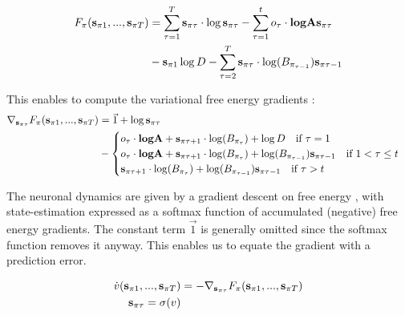 \documentclass[review,12pt,authoryear]{elsarticle}
\begin{document}
\begin{equation}
    \begin{split}
        F_\pi(\bold s_{\pi 1},...,\bold s_{\pi T}) &= \sum_{\tau = 1}^T \bold s_{\pi \tau } \cdot \log \bold s_{\pi \tau } 
        - \sum_{\tau = 1}^t o_\tau \cdot \textbf{log} \bold A \bold s_{\pi \tau }\\
        &- \bold s_{\pi 1 } \log D- \sum_{\tau = 2}^T \bold s_{\pi \tau } \cdot \log (B_{\pi_{\tau-1}})\bold s_{\pi \tau-1 }
    \end{split}
\end{equation}

This enables to compute the variational free energy gradients \citep{petersenMatrixCookbook}:
\begin{equation}
    \label{eq:vfe gradients perception}
    \begin{split}
        \nabla_{\bold s_{\pi\tau}} F_\pi(\bold s_{\pi 1},...,\bold s_{\pi T})& = \vec {1} +\log  \bold s_{\pi\tau}  \\
        &- \begin{cases}
             o_\tau \cdot \textbf{log} \bold A+ \bold s_{\pi\tau+1} \cdot \log (B_{\pi_{\tau}}) + \log D \quad  \text{if } \tau = 1 \\
            o_\tau \cdot \textbf{log} \bold A+ \bold s_{\pi\tau+1} \cdot \log (B_{\pi_{\tau}}) +\log (B_{\pi_{\tau-1}}) \bold s_{\pi\tau-1} \quad \text{if } 1<\tau \leq t  \\
             \bold s_{\pi\tau+1} \cdot \log (B_{\pi_{\tau}}) +\log (B_{\pi_{\tau-1}}) \bold s_{\pi\tau-1} \quad \text{if }  \tau > t
        \end{cases}
    \end{split}
\end{equation}

The neuronal dynamics are given by a gradient descent on free energy \citep{fristonActiveInferenceProcess2017}, with state-estimation expressed as a softmax function of accumulated (negative) free energy gradients. The constant term $\vec{1}$ is generally omitted since the softmax function removes it anyway. This enables us to equate the gradient with a prediction error.

  	\begin{equation}
  	\label{eq: perceptual dynamics}
  	    \begin{split}
  	        \dot v (\bold s_{\pi 1},...,\bold s_{\pi T})&=-\nabla_{\bold s_{\pi\tau}} F_\pi(\bold s_{\pi 1},...,\bold s_{\pi T}) \\
  	        \bold s_{\pi\tau} = \sigma (v)
  	    \end{split}
  	\end{equation}
  	
\end{document}
